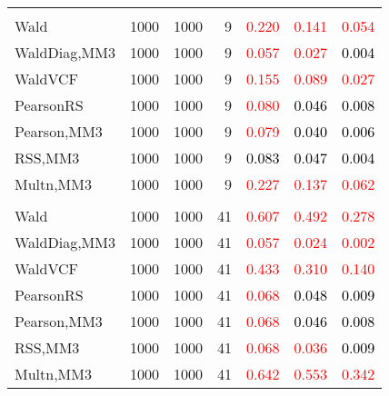 \documentclass[
]{article}
\begin{document}
\begin{table}[H]
{\begin{tabular}[t]{lrrrrrr}
\addlinespace[0.3em]
\multicolumn{7}{l}{\textbf{2F 10V}}\\
\hspace{1em}Wald & 1000 & 1000 & 9 & \textcolor{red}{0.220} & \textcolor{red}{0.141} & \textcolor{red}{0.054}\\
\hspace{1em}WaldDiag,MM3 & 1000 & 1000 & 9 & \textcolor{red}{0.057} & \textcolor{red}{0.027} & \textcolor{black}{0.004}\\
\hspace{1em}WaldVCF & 1000 & 1000 & 9 & \textcolor{red}{0.155} & \textcolor{red}{0.089} & \textcolor{red}{0.027}\\
\hspace{1em}PearsonRS & 1000 & 1000 & 9 & \textcolor{red}{0.080} & \textcolor{black}{0.046} & \textcolor{black}{0.008}\\
\hspace{1em}Pearson,MM3 & 1000 & 1000 & 9 & \textcolor{red}{0.079} & \textcolor{black}{0.040} & \textcolor{black}{0.006}\\
\hspace{1em}RSS,MM3 & 1000 & 1000 & 9 & \textcolor{black}{0.083} & \textcolor{black}{0.047} & \textcolor{black}{0.004}\\
\hspace{1em}Multn,MM3 & 1000 & 1000 & 9 & \textcolor{red}{0.227} & \textcolor{red}{0.137} & \textcolor{red}{0.062}\\
\addlinespace[0.3em]
\multicolumn{7}{l}{\textbf{3F 15V}}\\
\hspace{1em}Wald & 1000 & 1000 & 41 & \textcolor{red}{0.607} & \textcolor{red}{0.492} & \textcolor{red}{0.278}\\
\hspace{1em}WaldDiag,MM3 & 1000 & 1000 & 41 & \textcolor{red}{0.057} & \textcolor{red}{0.024} & \textcolor{red}{0.002}\\
\hspace{1em}WaldVCF & 1000 & 1000 & 41 & \textcolor{red}{0.433} & \textcolor{red}{0.310} & \textcolor{red}{0.140}\\
\hspace{1em}PearsonRS & 1000 & 1000 & 41 & \textcolor{red}{0.068} & \textcolor{black}{0.048} & \textcolor{black}{0.009}\\
\hspace{1em}Pearson,MM3 & 1000 & 1000 & 41 & \textcolor{red}{0.068} & \textcolor{black}{0.046} & \textcolor{black}{0.008}\\
\hspace{1em}RSS,MM3 & 1000 & 1000 & 41 & \textcolor{red}{0.068} & \textcolor{red}{0.036} & \textcolor{black}{0.009}\\
\hspace{1em}Multn,MM3 & 1000 & 1000 & 41 & \textcolor{red}{0.642} & \textcolor{red}{0.553} & \textcolor{red}{0.342}\\
\bottomrule
\end{tabular}}
\endgroup{}
\end{table}
\end{document}
